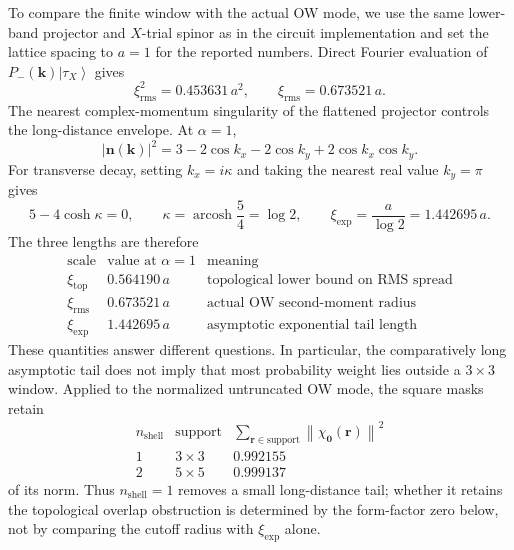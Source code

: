 \documentclass[aps,prb,onecolumn,nofootinbib,superscriptaddress]{revtex4-2}
\newcommand{\mbf}[1]{\mathbf{#1}}
\newcommand{\ket}[1]{\left|#1\right\rangle}
\newcommand{\norm}[1]{\left\lVert#1\right\rVert}
\begin{document}
To compare the finite window with the actual OW mode, we use the same lower-band projector and $X$-trial spinor as in the circuit implementation and set the lattice spacing to $a=1$ for the reported numbers.  Direct Fourier evaluation of $P_-(\mbf{k})\ket{\tau_X}$ gives
\begin{equation}
\xi_{\mathrm{rms}}^2=0.453631\,a^2,
\qquad
\xi_{\mathrm{rms}}=0.673521\,a.
\end{equation}
The nearest complex-momentum singularity of the flattened projector controls the long-distance envelope.  At $\alpha=1$,
\begin{equation}
|\mbf{n}(\mbf{k})|^2
=3-2\cos k_x-2\cos k_y+2\cos k_x\cos k_y .
\end{equation}
For transverse decay, setting $k_x=i\kappa$ and taking the nearest real value $k_y=\pi$ gives
\begin{equation}
5-4\cosh\kappa=0,
\qquad
\kappa=\operatorname{arcosh}\frac54=\log2,
\qquad
\xi_{\mathrm{exp}}=\frac{a}{\log2}=1.442695\,a.
\end{equation}
The three lengths are therefore
\begin{equation}
\begin{array}{c|c|l}
\text{scale} & \text{value at }\alpha=1 & \text{meaning}\\
\hline
\xi_{\mathrm{top}} & 0.564190\,a & \text{topological lower bound on RMS spread}\\
\xi_{\mathrm{rms}} & 0.673521\,a & \text{actual OW second-moment radius}\\
\xi_{\mathrm{exp}} & 1.442695\,a & \text{asymptotic exponential tail length}
\end{array}
\end{equation}
These quantities answer different questions.  In particular, the comparatively long asymptotic tail does not imply that most probability weight lies outside a $3\times3$ window.  Applied to the normalized untruncated OW mode, the square masks retain
\begin{equation}
\begin{array}{c|c|c}
n_{\mathrm{shell}} & \text{support} & \sum_{\mbf{r}\in\mathrm{support}}\norm{\chi_{\mbf{0}}(\mbf{r})}^2\\
\hline
1 & 3\times3 & 0.992155\\
2 & 5\times5 & 0.999137
\end{array}
\end{equation}
of its norm.  Thus $n_{\mathrm{shell}}=1$ removes a small long-distance tail; whether it retains the topological overlap obstruction is determined by the form-factor zero below, not by comparing the cutoff radius with $\xi_{\mathrm{exp}}$ alone.
\end{document}
